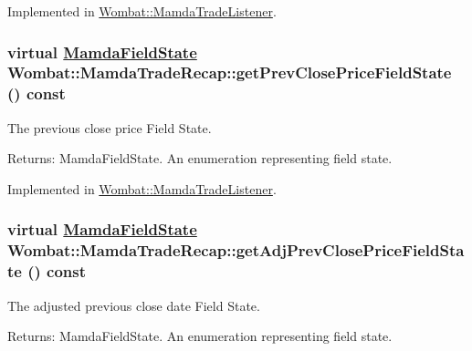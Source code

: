 Implemented in \hyperlink{classWombat_1_1MamdaTradeListener_47222f2a6f39a3fcca3128317718cc79}{Wombat::Mamda\-Trade\-Listener}.\hypertarget{classWombat_1_1MamdaTradeRecap_59c935c0a3b018e48fd9b1bb476cd4b7}{
\subsubsection[getPrevClosePriceFieldState]{\setlength{\rightskip}{0pt plus 5cm}virtual \hyperlink{namespaceWombat_93aac974f2ab713554fd12a1fa3b7d2a}{Mamda\-Field\-State} Wombat::Mamda\-Trade\-Recap::get\-Prev\-Close\-Price\-Field\-State () const}}
\label{classWombat_1_1MamdaTradeRecap_59c935c0a3b018e48fd9b1bb476cd4b7}


The previous close price Field State. 

\begin{Desc}
\item[Returns:]Mamda\-Field\-State. An enumeration representing field state. \end{Desc}


Implemented in \hyperlink{classWombat_1_1MamdaTradeListener_6b5ce55994a03c95c2a4b0732f75c664}{Wombat::Mamda\-Trade\-Listener}.\hypertarget{classWombat_1_1MamdaTradeRecap_c19498f35c75d790cbfa74fc249824eb}{
\subsubsection[getAdjPrevClosePriceFieldState]{\setlength{\rightskip}{0pt plus 5cm}virtual \hyperlink{namespaceWombat_93aac974f2ab713554fd12a1fa3b7d2a}{Mamda\-Field\-State} Wombat::Mamda\-Trade\-Recap::get\-Adj\-Prev\-Close\-Price\-Field\-State () const}}
\label{classWombat_1_1MamdaTradeRecap_c19498f35c75d790cbfa74fc249824eb}


The adjusted previous close date Field State. 

\begin{Desc}
\item[Returns:]Mamda\-Field\-State. An enumeration representing field state. \end{Desc}


